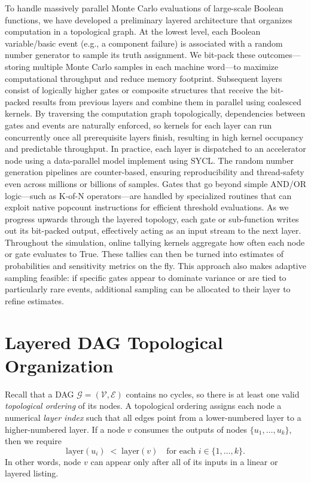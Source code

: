 To handle massively parallel Monte Carlo evaluations of large-scale Boolean functions, we have developed a preliminary layered architecture that organizes computation in a topological graph. At the lowest level, each Boolean variable/basic event (e.g., a component failure) is associated with a random number generator to sample its truth assignment. We bit-pack these outcomes—storing multiple Monte Carlo samples in each machine word—to maximize computational throughput and reduce memory footprint. Subsequent layers consist of logically higher gates or composite structures that receive the bit-packed results from previous layers and combine them in parallel using coalesced kernels. By traversing the computation graph topologically, dependencies between gates and events are naturally enforced, so kernels for each layer can run concurrently once all prerequisite layers finish, resulting in high kernel occupancy and predictable throughput.
In practice, each layer is dispatched to an accelerator node using a data-parallel model implement using SYCL. The random number generation pipelines are counter-based, ensuring reproducibility and thread-safety even across millions or billions of samples. Gates that go beyond simple AND/OR logic—such as K-of-N operators—are handled by specialized routines that can exploit native popcount instructions for efficient threshold evaluations. As we progress upwards through the layered topology, each gate or sub-function writes out its bit-packed output, effectively acting as an input stream to the next layer.
Throughout the simulation, online tallying kernels aggregate how often each node or gate evaluates to True. These tallies can then be turned into estimates of probabilities and sensitivity metrics on the fly. This approach also makes adaptive sampling feasible: if specific gates appear to dominate variance or are tied to particularly rare events, additional sampling can be allocated to their layer to refine estimates.

\section{Layered DAG Topological Organization}
\label{sec:layered_dag_traversal}

Recall that a DAG \(\mathcal{G} = (\mathcal{V}, \mathcal{E})\) contains no cycles, so there is at least one valid \emph{topological ordering} of its nodes.  A topological ordering assigns each node a numerical \emph{layer index} such that all edges point from a lower-numbered layer to a higher-numbered layer. If a node \(v\) consumes the outputs of nodes \(\{u_1,\dots,u_k\}\), then we require
\[
\text{layer}(u_i) \;<\; \text{layer}(v)
\quad
\text{for each }i\in\{1,\dots,k\}.
\]
In other words, node \(v\) can appear only after all of its inputs in a linear or layered listing.

